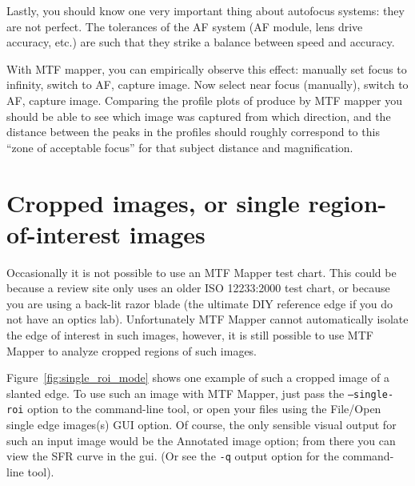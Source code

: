 \documentclass[a4paper]{article}
\begin{document}
Lastly, you should know one very important thing about autofocus systems:
they are not perfect. The tolerances of the AF system (AF module, lens
drive accuracy, etc.) are such that they strike a balance between speed and
accuracy. 

With MTF mapper, you can empirically observe this effect:
manually set focus to infinity, switch to AF, capture image. Now select near
focus (manually), switch to AF, capture image. Comparing the profile plots
of produce by MTF mapper you should be able to see which image was captured
from which direction, and the distance between the peaks in the profiles
should roughly correspond to this ``zone of acceptable focus'' for that
subject distance and magnification.

\section{Cropped images, or single region-of-interest images}
\label{sec:single_roi_mode}
Occasionally it is not possible to use an MTF Mapper test chart. This could
be because a review site only uses an older ISO 12233:2000 test chart, or
because you are using a back-lit razor blade (the ultimate DIY reference edge if
you do not have an optics lab). Unfortunately MTF Mapper cannot
automatically isolate the edge of interest in such images, however, 
it is still possible to use MTF Mapper to analyze cropped regions of such
images.

Figure~\ref{fig:single_roi_mode} shows one example of such a cropped image
of a slanted edge. To use such an image with MTF Mapper, just pass the
\texttt{--single-roi} option to the command-line tool, or open your files
using the \textsf{File/Open single edge images(s)} GUI option. Of course, the only
sensible visual output for such an input image would be the \textsf{Annotated
image} option; from there you can view the SFR curve in the gui. (Or see the
\texttt{-q} output option for the command-line tool).
\end{document}
